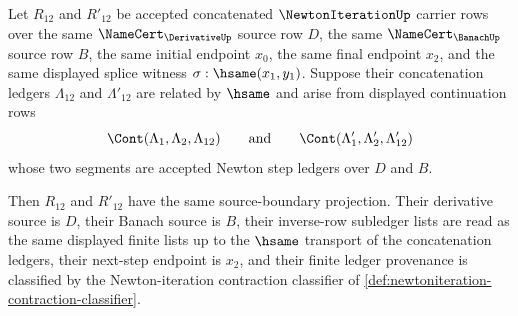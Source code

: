 \begin{theorem}
\label{thm:newtoniteration-splice-source-determinacy}
Let $R_{12}$ and $R'_{12}$ be accepted concatenated $\NewtonIterationUp$ carrier rows over the same $\NameCert_{\DerivativeUp}$ source row $D$, the same $\NameCert_{\BanachUp}$ source row $B$, the same initial endpoint $x_0$, the same final endpoint $x_2$, and the same displayed splice witness $\sigma:\hsame(x_1,y_1)$. Suppose their concatenation ledgers $\Lambda_{12}$ and $\Lambda'_{12}$ are related by $\hsame$ and arise from displayed continuation rows
$$
\Cont(\Lambda_1,\Lambda_2,\Lambda_{12})
\qquad\text{and}\qquad
\Cont(\Lambda'_1,\Lambda'_2,\Lambda'_{12})
$$
whose two segments are accepted Newton step ledgers over $D$ and $B$.

Then $R_{12}$ and $R'_{12}$ have the same source-boundary projection. Their derivative source is $D$, their Banach source is $B$, their inverse-row subledger lists are read as the same displayed finite lists up to the $\hsame$ transport of the concatenation ledgers, their next-step endpoint is $x_2$, and their finite ledger provenance is classified by the Newton-iteration contraction classifier of \autoref{def:newtoniteration-contraction-classifier}.
\end{theorem}
